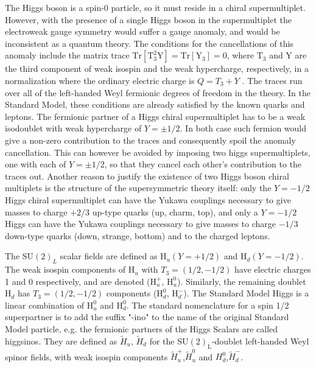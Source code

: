 The Higgs boson is a spin-0 particle, so it must reside in a chiral supermultiplet. However, with the presence of a single Higgs boson in the supermultiplet the electroweak gauge symmetry would suffer a gauge anomaly, and would be inconsistent as a quantum theory. The conditions for the cancellations of this anomaly include the matrix trace $\text{Tr}[\text{T}^{2}_{3}\text{Y}] = \text{Tr}[\text{Y}_{3}] = 0$, where $\text{T}_{3}$ and Y are the third component of weak isospin and the weak hypercharge, respectively, in a normalization where the ordinary electric charge is $Q = T_{3} + Y$ . The traces run over all of the left-handed Weyl fermionic degrees of freedom in the theory. In the Standard Model, these conditions are already satisfied by the known quarks and leptons. The fermionic partner of a Higgs chiral supermultiplet has to be a weak isodoublet with weak hypercharge of $Y = \pm 1/2$. In both case such fermion would give a non-zero contribution to the traces and consequently spoil the anomaly cancellation. This can however be avoided by imposing two higgs supermultiplets, one with each of $Y = \pm1/2$, so that they cancel each other's contribution to the traces out. Another reason to justify the existence of two Higgs boson chiral multiplets is the structure of the supersymmetric theory itself: only the $Y = -1/2$ Higgs chiral supermultiplet can have the Yukawa couplings necessary to give masses to charge $+2/3$ up-type quarks (up, charm, top), and only a $Y = -1/2$ Higgs can have the Yukawa couplings necessary to give masses to charge $-1/3$ down-type quarks (down, strange, bottom) and to the charged leptons. 

The $\text{SU}(2)_{L}$ scalar fields are defined as $\text{H}_{u}(Y = +1/2)$ and $\text{H}_{d}(Y = -1/2)$. The weak isospin components of $\text{H}_{u}$ with $T_{3} = (1/2, -1/2)$ have electric charges 1 and 0 respectively, and are denoted ($\text{H}^{+}_{u}$, $\text{H}^{0}_{u}$). Similarly, the remaining doublet $\text{H}_{d}$ has $T_{3} = (1/2, -1/2)$ components ($\text{H}^{0}_{d}$, $\text{H}^{-}_{d}$). The Standard Model Higgs is a linear combination of $\text{H}^{0}_{u}$ and $\text{H}^{0}_{d}$. The standard nomenclature for a spin 1/2 superpartner is to add the suffix "-ino" to the name of the original Standard Model particle, e.g. the fermionic partners of the Higgs Scalars are called higgsinos. They are defined as $\widetilde{H}_{u}$, $\widetilde{H}_{d}$ for the $\text{SU}(2)_{\text{L}}$-doublet left-handed Weyl spinor fields, with weak isospin components $\widetilde{H}^{+}_{u}$,$\widetilde{H}^{0}_{u}$ and $H^{0}_{d}$,$\widetilde{H}^{-}_{d}$.

